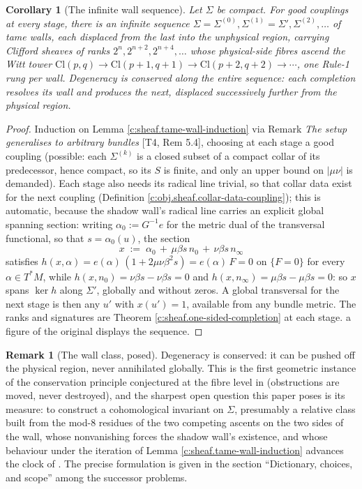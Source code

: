 \documentclass[11pt]{article}
\newtheorem{corollary}[theorem]{Corollary}
\theoremstyle{definition}
\newtheorem{remark}[theorem]{Remark}
\theoremstyle{plain}
\providecommand{\Cl}{}\renewcommand{\Cl}{\mathrm{Cl}}
\providecommand{\Sig}{}\renewcommand{\Sig}{\Sigma}
\providecommand{\nInf}{}\renewcommand{\nInf}{n_\infty}
\providecommand{\nO}{}\renewcommand{\nO}{n_0}
\begin{document}
\begin{corollary}[The infinite wall sequence]\label{c:sheaf.infinite-wall-sequence}
Let $\Sig$ be compact. For good couplings at every stage, there is an infinite sequence $\Sig = \Sig^{(0)}, \Sig^{(1)} = \Sig', \Sig^{(2)}, \dots$ of tame walls, each displaced from the last into the unphysical region, carrying Clifford sheaves of ranks $2^n, 2^{n+2}, 2^{n+4}, \dots$ whose physical-side fibres ascend the Witt tower $\Cl(p,q) \to \Cl(p{+}1,q{+}1) \to \Cl(p{+}2,q{+}2) \to \cdots$, one Rule-1 rung per wall. Degeneracy is conserved along the entire sequence: each completion resolves its wall and produces the next, displaced successively further from the physical region.
\end{corollary}
\begin{proof}
Induction on Lemma \ref{c:sheaf.tame-wall-induction} via Remark \emph{The setup generalises to arbitrary bundles} [T4, Rem 5.4], choosing at each stage a good coupling (possible: each $\Sig^{(k)}$ is a closed subset of a compact collar of its predecessor, hence compact, so its $S$ is finite, and only an upper bound on $|\mu\nu|$ is demanded). Each stage also needs its radical line trivial, so that collar data exist for the next coupling (Definition \ref{c:obj.sheaf.collar-data-coupling}); this is automatic, because the shadow wall's radical line carries an explicit global spanning section: writing $\alpha_0 := G^{-1}e$ for the metric dual of the transversal functional, so that $s = \alpha_0(u)$, the section
\[
x \;:=\; \alpha_0 \,+\, \mu\beta s\, \nO \,+\, \nu\beta s\, \nInf
\]
satisfies $h(x, \alpha) = e(\alpha)\,(1 + 2\mu\nu\beta^2 s) = e(\alpha)\,F = 0$ on $\{F = 0\}$ for every $\alpha \in T^*M$, while $h(x, \nO) = \nu\beta s - \nu\beta s = 0$ and $h(x, \nInf) = \mu\beta s - \mu\beta s = 0$: so $x$ spans $\ker h$ along $\Sig'$, globally and without zeros. A global transversal for the next stage is then any $u'$ with $x(u') = 1$, available from any bundle metric. The ranks and signatures are Theorem \ref{c:sheaf.one-sided-completion} at each stage. a figure of the original displays the sequence.

\end{proof}

\begin{remark}[The wall class, posed]\label{c:note.sheaf.wall-class-posed}
Degeneracy is conserved: it can be pushed off the physical region, never annihilated globally. This is the first geometric instance of the conservation principle conjectured at the fibre level in \cite[Conj.~7.9]{ButlerT1} (obstructions are moved, never destroyed), and the sharpest open question this paper poses is its measure: to construct a cohomological invariant on $\Sig$, presumably a relative class built from the mod-8 residues of the two competing ascents on the two sides of the wall, whose nonvanishing forces the shadow wall's existence, and whose behaviour under the iteration of Lemma \ref{c:sheaf.tame-wall-induction} advances the clock of \cite[\S7]{ButlerT1}. The precise formulation is given in the section ``Dictionary, choices, and scope'' among the successor problems.
\end{remark}
\end{document}
